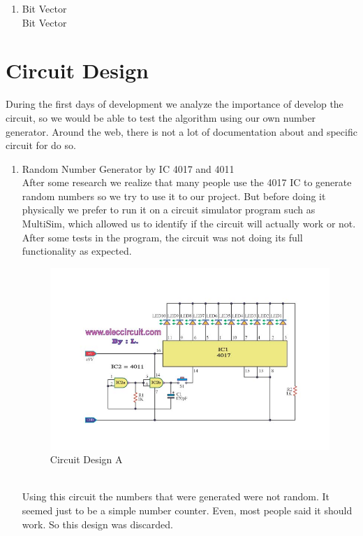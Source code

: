 \documentclass[twocolumn]{IEEEtran}
\begin{document}
\begin{enumerate}
    	\item Bit Vector\\
        Bit Vector \cite{2}
        
	\end{enumerate}
    
    
\section{Circuit Design}
During the first days of development we analyze the importance of develop the circuit, so we would be able to test the algorithm using our own number generator. Around the web, there is not a lot of documentation about and specific circuit for do so.

\begin{enumerate} 
	\item Random Number Generator by IC 4017 and 4011\\
    
    After some research we realize that many people use the 4017 IC to generate random numbers so we try to use it to our project. But before doing it physically we prefer to run it on a circuit simulator program such as MultiSim, which allowed us to identify if the circuit will actually work or not. After some tests in the program, the circuit was not doing its full functionality as expected.
    \begin{figure}[h!]
	\centering
	\includegraphics[width=\columnwidth]{src/Rand_V1.jpg}
	\caption{Circuit Design A}
	\end{figure}\\
    
    Using this circuit the numbers that were generated were not random. It seemed just to be a simple number counter. Even, most people said it should work. So this design was discarded.\\
    

\end{enumerate}
\end{document}
